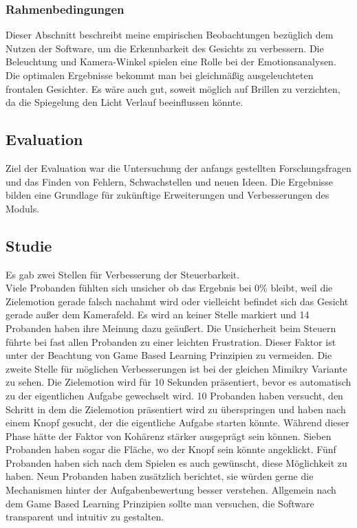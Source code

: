 \subsubsection{Rahmenbedingungen}
Dieser Abschnitt beschreibt meine empirischen Beobachtungen bezüglich dem Nutzen der Software, um die Erkennbarkeit des Gesichts zu verbessern.
Die Beleuchtung und Kamera-Winkel spielen eine Rolle bei der Emotionsanalysen.
Die optimalen Ergebnisse bekommt man bei gleichmäßig ausgeleuchteten frontalen Gesichter.
Es wäre auch gut, soweit möglich auf Brillen zu verzichten, da die Spiegelung den Licht Verlauf beeinflussen könnte.

\subsection{Evaluation}
Ziel der Evaluation war die Untersuchung der anfangs gestellten Forschungsfragen und das Finden von Fehlern, Schwachstellen und neuen Ideen. Die Ergebnisse bilden eine Grundlage für zukünftige Erweiterungen und Verbesserungen des Moduls. 

\subsection{Studie}
Es gab zwei Stellen für Verbesserung der Steuerbarkeit. \\
Viele Probanden fühlten sich unsicher ob das Ergebnis bei 0\% bleibt, weil die Zielemotion gerade falsch nachahmt wird oder vielleicht befindet sich das Gesicht gerade außer dem Kamerafeld. Es wird an keiner Stelle markiert und 14 Probanden haben ihre Meinung dazu geäußert. 
Die Unsicherheit beim Steuern führte bei fast allen Probanden zu einer leichten Frustration. Dieser Faktor ist unter der Beachtung von Game Based Learning Prinzipien zu vermeiden.  
Die zweite Stelle für möglichen Verbesserungen ist bei der gleichen Mimikry Variante zu sehen. Die Zielemotion wird für 10 Sekunden präsentiert, bevor es automatisch zu der eigentlichen Aufgabe gewechselt wird. 10 Probanden haben versucht, den Schritt in dem die Zielemotion präsentiert wird zu überspringen und haben nach einem Knopf gesucht, der die eigentliche Aufgabe starten könnte. Während dieser Phase hätte der Faktor von Kohärenz stärker ausgeprägt sein können. Sieben Probanden haben sogar die Fläche, wo der Knopf sein könnte angeklickt. Fünf Probanden haben sich nach dem Spielen es auch gewünscht, diese Möglichkeit zu haben. 
Neun Probanden haben zusätzlich berichtet, sie würden gerne die Mechanismen hinter der Aufgabenbewertung besser verstehen. Allgemein nach dem Game Based Learning Prinzipien %
sollte man versuchen, die Software transparent und intuitiv zu gestalten.
